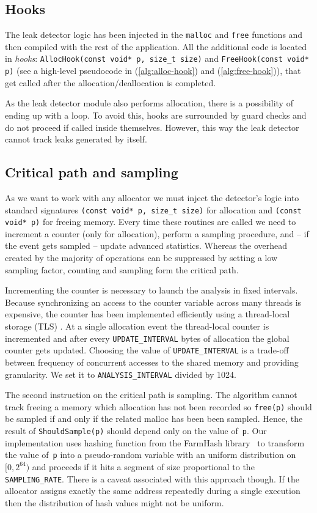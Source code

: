 \documentclass[preprint, numbers]{sigplanconf}
\newcommand{\todo}[1]{{\color{red}{(TODO: #1)}}}
\begin{document}
\subsection{Hooks}

The leak detector logic has been injected in the \texttt{malloc} and \texttt{free} functions
and then compiled with the rest of the application.
All the additional code is located in \textit{hooks}: \texttt{AllocHook(const void*~p, size\_t size)}
and \texttt{FreeHook(const void* p)}
(see a high-level pseudocode in (\ref{alg:alloc-hook}) and (\ref{alg:free-hook})),
that get called after the allocation/deallocation is completed.

As the leak detector module also performs allocation, there is a possibility
of ending up with a loop.
To avoid this, hooks are surrounded by guard checks and do not proceed
if called inside themselves.
However, this way the leak detector cannot track leaks generated by itself.

\subsection{Critical path and sampling}

As we want to work with any allocator we must inject the detector's logic into
standard signatures \texttt{(const void* p, size\_t size)} for allocation and
\texttt{(const void* p)} for freeing memory.
Every time these routines are called we need to increment a counter (only for allocation),
perform a sampling procedure, and -- if the event gets sampled -- update advanced statistics.
Whereas the overhead created by the majority of operations can be suppressed by setting a low
sampling factor, counting and sampling form the critical path.

Incrementing the counter is necessary to launch the analysis in fixed intervals.
Because synchronizing an access to the counter variable across many threads is expensive,
the counter has been implemented efficiently using a thread-local storage (TLS) \todo{cite?}.
At a single allocation event the thread-local counter is incremented and after every \texttt{UPDATE\_INTERVAL}
bytes of allocation the global counter gets updated.
Choosing the value of \texttt{UPDATE\_INTERVAL} is a trade-off between frequency of concurrent accesses
to the shared memory and providing granularity.
We set it to \texttt{ANALYSIS\_INTERVAL} divided by 1024.

The second instruction on the critical path is sampling.
The algorithm cannot track freeing a memory which allocation has not been recorded
so \texttt{free(p)} should be sampled if and only if the related malloc has been been sampled.
Hence, the result of \texttt{ShouldSample(p)} should depend only on the value of~\texttt{p}.
Our implementation uses hashing function from the FarmHash library~\cite{farmhash}
to transform the value of~\texttt{p} into a pseudo-random variable with an uniform
distribution on $[0, 2^{64})$ and proceeds if it hits a segment of size proportional
to the \texttt{SAMPLING\_RATE}.
There is a caveat associated with this approach though.
If the allocator assigns exactly the same address repeatedly during a single execution
then the distribution of hash values might not be uniform.
\end{document}
